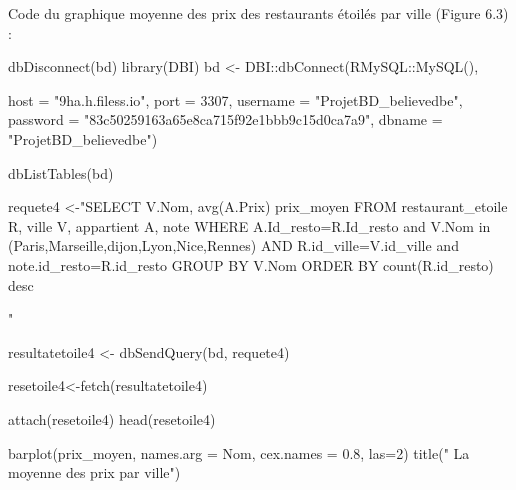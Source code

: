 \documentclass[mstat,12pt]{unswthesis}
\newenvironment{Shaded}{\begin{snugshade}}{\end{snugshade}}
\newcommand{\AttributeTok}[1]{\textcolor[rgb]{0.77,0.63,0.00}{#1}}
\newcommand{\DecValTok}[1]{\textcolor[rgb]{0.00,0.00,0.81}{#1}}
\newcommand{\FloatTok}[1]{\textcolor[rgb]{0.00,0.00,0.81}{#1}}
\newcommand{\FunctionTok}[1]{\textcolor[rgb]{0.00,0.00,0.00}{#1}}
\newcommand{\NormalTok}[1]{#1}
\newcommand{\OtherTok}[1]{\textcolor[rgb]{0.56,0.35,0.01}{#1}}
\newcommand{\SpecialCharTok}[1]{\textcolor[rgb]{0.00,0.00,0.00}{#1}}
\newcommand{\StringTok}[1]{\textcolor[rgb]{0.31,0.60,0.02}{#1}}
\begin{document}
\normalsize
\bigskip

Code du graphique moyenne des prix des restaurants étoilés par ville
(Figure 6.3) : \tiny

\begin{Shaded}
\begin{Highlighting}[]
\FunctionTok{dbDisconnect}\NormalTok{(bd)}
\FunctionTok{library}\NormalTok{(DBI)}
\NormalTok{bd }\OtherTok{\textless{}{-}}\NormalTok{ DBI}\SpecialCharTok{::}\FunctionTok{dbConnect}\NormalTok{(RMySQL}\SpecialCharTok{::}\FunctionTok{MySQL}\NormalTok{(),}
                     
                     \AttributeTok{host =} \StringTok{"9ha.h.filess.io"}\NormalTok{, }\AttributeTok{port =} \DecValTok{3307}\NormalTok{,}
                     \AttributeTok{username =} \StringTok{"ProjetBD\_believedbe"}\NormalTok{,}
                     \AttributeTok{password =} \StringTok{"83c50259163a65e8ca715f92e1bbb9c15d0ca7a9"}\NormalTok{,}
                     \AttributeTok{dbname =} \StringTok{"ProjetBD\_believedbe"}\NormalTok{)}

\FunctionTok{dbListTables}\NormalTok{(bd)}

\NormalTok{requete4 }\OtherTok{\textless{}{-}}\StringTok{"SELECT V.Nom, avg(A.Prix) prix\_moyen}
\StringTok{FROM restaurant\_etoile R, ville V, appartient A, note}
\StringTok{WHERE A.Id\_resto=R.Id\_resto}
\StringTok{and V.Nom in (\textquotesingle{}Paris\textquotesingle{},\textquotesingle{}Marseille\textquotesingle{},\textquotesingle{}dijon\textquotesingle{},\textquotesingle{}Lyon\textquotesingle{},\textquotesingle{}Nice\textquotesingle{},\textquotesingle{}Rennes\textquotesingle{})}
\StringTok{AND R.id\_ville=V.id\_ville}
\StringTok{and note.id\_resto=R.id\_resto}
\StringTok{GROUP BY V.Nom}
\StringTok{ORDER BY count(R.id\_resto) desc}


\StringTok{"}

\NormalTok{resultatetoile4 }\OtherTok{\textless{}{-}} \FunctionTok{dbSendQuery}\NormalTok{(bd, requete4)}

\NormalTok{resetoile4}\OtherTok{\textless{}{-}}\FunctionTok{fetch}\NormalTok{(resultatetoile4)}

\FunctionTok{attach}\NormalTok{(resetoile4)}
\FunctionTok{head}\NormalTok{(resetoile4)}

\FunctionTok{barplot}\NormalTok{(}\StringTok{\textasciigrave{}}\AttributeTok{prix\_moyen}\StringTok{\textasciigrave{}}\NormalTok{, }\AttributeTok{names.arg =}\NormalTok{ Nom, }\AttributeTok{cex.names =} \FloatTok{0.8}\NormalTok{, }\AttributeTok{las=}\DecValTok{2}\NormalTok{)}
\FunctionTok{title}\NormalTok{(}\StringTok{" La moyenne des prix par ville"}\NormalTok{)}
\end{Highlighting}
\end{Shaded}
\end{document}
